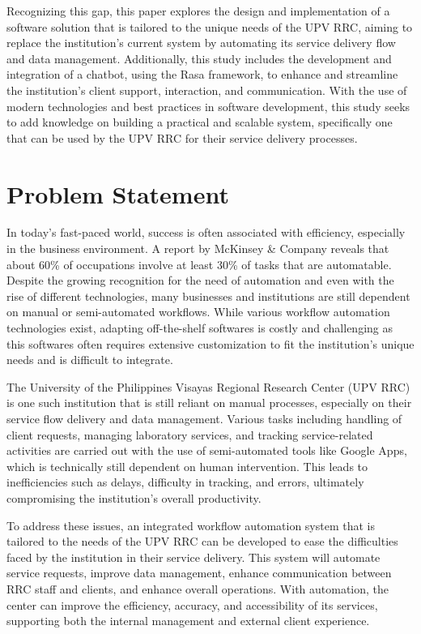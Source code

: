 Recognizing this gap, this paper explores the design and implementation of a software solution that is tailored to the unique needs of the UPV RRC, aiming to replace the institution’s current system by automating its service delivery flow and data management. Additionally, this study includes the development and integration of a chatbot, using the Rasa framework, to enhance and streamline the institution’s client support, interaction, and communication. With the use of modern technologies and best practices in software development, this study seeks to add knowledge on building a practical and scalable system, specifically one that can be used by the UPV RRC for their service delivery processes.

\section{Problem Statement}

In today’s fast-paced world, success is often associated with efficiency, especially in the business environment. A report by McKinsey \& Company \cite{manyika2017} reveals that about 60\% of occupations involve at least 30\% of tasks that are automatable. Despite the growing recognition for the need of automation and even with the rise of different technologies, many businesses and institutions are still dependent on manual or semi-automated workflows. While various workflow automation technologies exist, adapting off-the-shelf softwares is costly and challenging as this softwares often requires extensive customization to fit the institution’s unique needs and is difficult to integrate. 

The University of the Philippines Visayas Regional Research Center (UPV RRC) is one such institution that is still reliant on manual processes, especially on their service flow delivery and data management. Various tasks including handling of client requests, managing laboratory services, and tracking service-related activities are carried out with the use of semi-automated tools like Google Apps, which is technically still dependent on human intervention. This leads to inefficiencies such as delays, difficulty in tracking, and errors, ultimately compromising the institution’s overall productivity.

To address these issues, an integrated workflow automation system that is tailored to the needs of the UPV RRC can be developed to ease the difficulties faced by the institution in their service delivery. This system will  automate service requests, improve data management, enhance communication between RRC staff and clients, and enhance overall operations. With automation, the center can improve the efficiency, accuracy, and accessibility of its services, supporting both the internal management and external client experience.

